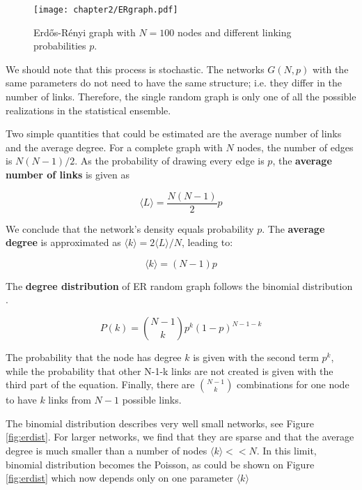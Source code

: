 \begin{figure}[H]
	\centering
	\texttt{[image: chapter2/ERgraph.pdf]}
	\caption[Erdős-R\' {e}nyi]{Erdős-R\' {e}nyi graph with $N=100$ nodes and different linking probabilities $p$.}
	\label{fig:erp}
\end{figure}

We should note that this process is stochastic. The networks $G(N, p)$ with the same parameters do not need to have the same structure; i.e. they differ in the number of links. Therefore, the single random graph is only one of all the possible realizations in the statistical ensemble. 

Two simple quantities that could be estimated are the average number of links and the average degree. For a complete graph with $N$ nodes, the number of edges is $N(N-1)/2$. As the probability of drawing every edge is $p$, the \textbf{average number of links} is given as 

\begin{equation}
\langle L \rangle = \frac{N(N-1)}{2}p
\end{equation}

We conclude that the network's density equals probability $p$.
The \textbf{average degree} is approximated as $\langle k \rangle = 2 \langle L \rangle / N $, leading to:

\begin{equation}
\langle k \rangle = (N-1)p 
\end{equation}

The \textbf{degree distribution} of ER random graph follows the binomial distribution \cite{barabasi2016network}. 

\begin{equation}
P(k) = \binom{N-1}{k}p^k(1-p)^{N-1-k}
\end{equation}

The probability that the node has degree $k$ is given with the second term $p^k$, while the probability that other N-1-k links are not created is given with the third part of the equation. Finally, there are  $\binom{N-1}{k}$ combinations for one node to have $k$ links from $N-1$ possible links. 

The binomial distribution describes very well small networks, see Figure \ref{fig:erdist}. For larger networks, we find that they are sparse and that the average degree is much smaller than a number of nodes $\langle k \rangle << N$. In this limit, binomial distribution becomes the Poisson, as could be shown on Figure \ref{fig:erdist} which now depends only on one parameter $\langle k \rangle$

